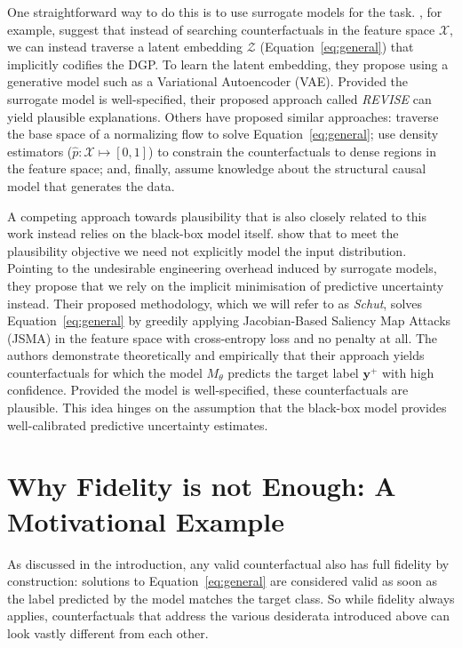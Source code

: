 One straightforward way to do this is to use surrogate models for the task. \citet{joshi2019realistic}, for example, suggest that instead of searching counterfactuals in the feature space $\mathcal{X}$, we can instead traverse a latent embedding $\mathcal{Z}$ (Equation~\ref{eq:general}) that implicitly codifies the DGP. To learn the latent embedding, they propose using a generative model such as a Variational Autoencoder (VAE). Provided the surrogate model is well-specified, their proposed approach called \textit{REVISE} can yield plausible explanations. Others have proposed similar approaches: \citet{dombrowski2021diffeomorphic} traverse the base space of a normalizing flow to solve Equation~\ref{eq:general}; \citet{poyiadzi2020face} use density estimators ($\hat{p}: \mathcal{X} \mapsto [0,1]$) to constrain the counterfactuals to dense regions in the feature space; and, finally, \citet{karimi2021algorithmic} assume knowledge about the structural causal model that generates the data.

A competing approach towards plausibility that is also closely related to this work instead relies on the black-box model itself. \citet{schut2021generating} show that to meet the plausibility objective we need not explicitly model the input distribution. Pointing to the undesirable engineering overhead induced by surrogate models, they propose that we rely on the implicit minimisation of predictive uncertainty instead. Their proposed methodology, which we will refer to as \textit{Schut}, solves Equation~\ref{eq:general} by greedily applying Jacobian-Based Saliency Map Attacks (JSMA) in the feature space with cross-entropy loss and no penalty at all. The authors demonstrate theoretically and empirically that their approach yields counterfactuals for which the model $M_{\theta}$ predicts the target label $\mathbf{y}^+$ with high confidence. Provided the model is well-specified, these counterfactuals are plausible. This idea hinges on the assumption that the black-box model provides well-calibrated predictive uncertainty estimates.

\section{Why Fidelity is not Enough: A Motivational Example}\label{fidelity}

As discussed in the introduction, any valid counterfactual also has full fidelity by construction: solutions to Equation~\ref{eq:general} are considered valid as soon as the label predicted by the model matches the target class. So while fidelity always applies, counterfactuals that address the various desiderata introduced above can look vastly different from each other. 

